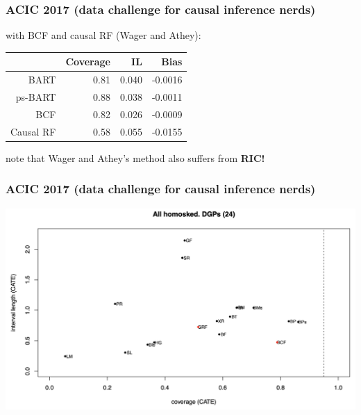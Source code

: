 \documentclass{beamer}
\newcommand{\bo}[1]{\textcolor{burntorange}{#1}}
\newcommand{\sk}{\vspace{.5cm}}
\begin{document}
\begin{frame}
	\frametitle{ACIC 2017 {\small (data challenge for causal inference nerds)}}
	with BCF and causal RF (Wager and Athey): \\ \sk

{
\begin{table}[ht]
\centering
\begin{tabular}{rrrr}
  \hline
 & Coverage & IL & Bias \\ 
  \hline
    BART & 0.81 & 0.040 & -0.0016  \\ 
  ps-BART & 0.88 & 0.038 & -0.0011  \\ 
BCF & 0.82 & 0.026 & -0.0009  \\ 
  Causal RF & 0.58 & 0.055 & -0.0155 \\
   \hline
\end{tabular}
\end{table}
}

\sk
{\small note that Wager and Athey's method also suffers from \bo{\bf RIC!}}
	
\end{frame}


\begin{frame}
	\frametitle{ACIC 2017 {\small (data challenge for causal inference nerds)}}
	
	\hspace*{-8mm}\includegraphics[scale=0.32]{figures/acic1}
	
\end{frame}
\end{document}
